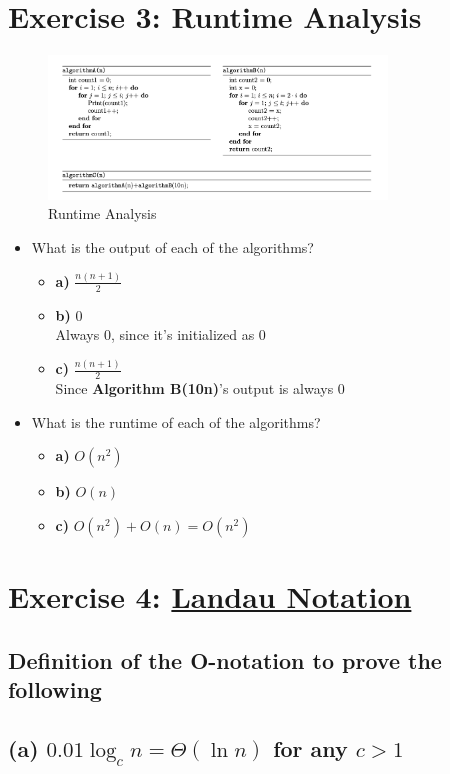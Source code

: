 \documentclass[9pt]{article}
\begin{document}
\begin{itemize}
\end{itemize} \section*{Exercise 3: Runtime Analysis} \begin{figure}[ht!] \centering \includegraphics[width=90mm]{03.jpg} \caption{Runtime Analysis\label{overflow}} \end{figure} \begin{itemize} \item What is the output of each of the algorithms? \begin{itemize} \item \textbf{a)} $\frac{n(n+1)}{2}$ \item \textbf{b)} $0$ \\ Always 0, since it's initialized as 0 \item \textbf{c)} $\frac{n(n+1)}{2}$ \\ Since \textbf{Algorithm B(10n)}'s output is always 0 \end{itemize} \item What is the runtime of each of the algorithms? \begin{itemize} \item \textbf{a)} $O(n^2)$ \item \textbf{b)} $O(n)$ \item \textbf{c)} $O(n^2)+O(n)=O(n^2)$ \end{itemize} \end{itemize}

\section*{Exercise 4: \href{https://www.youtube.com/watch?v=x9NhQUxyCpY}{Landau Notation}}

\subsection*{Definition of the O-notation to prove the following}
\subsection*{(a) \( 0.01 \log_c n = \Theta(\ln n) \) for any \( c > 1 \)}
\end{document}
